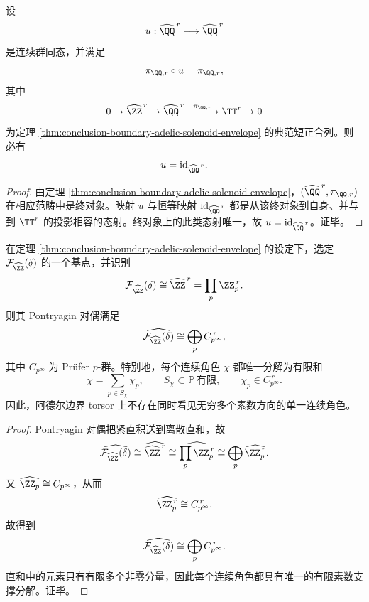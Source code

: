 \begin{corollary}[通用连通包络相对于基底的自同构刚性]\label{cor:conclusion-boundary-solenoid-over-base-rigidity}
设
\[
u:\widehat{\QQ}^{\,r}\longrightarrow \widehat{\QQ}^{\,r}
\]
是连续群同态，并满足
\[
\pi_{\QQ,r}\circ u=\pi_{\QQ,r},
\]
其中
\[
0\to \widehat{\ZZ}^{\,r}\to \widehat{\QQ}^{\,r}\xrightarrow{\ \pi_{\QQ,r}\ }\TT^r\to 0
\]
为定理 \ref{thm:conclusion-boundary-adelic-solenoid-envelope} 的典范短正合列。则必有
\[
u=\mathrm{id}_{\widehat{\QQ}^{\,r}}.
\]
\end{corollary}
\begin{proof}
由定理 \ref{thm:conclusion-boundary-adelic-solenoid-envelope}，\((\widehat{\QQ}^{\,r},\pi_{\QQ,r})\) 在相应范畴中是终对象。映射 \(u\) 与恒等映射
\(
\mathrm{id}_{\widehat{\QQ}^{\,r}}
\)
都是从该终对象到自身、并与到 \(\TT^r\) 的投影相容的态射。终对象上的此类态射唯一，故 \(u=\mathrm{id}_{\widehat{\QQ}^{\,r}}\)。证毕。
\end{proof}

\begin{theorem}\label{thm:conclusion-boundary-adelic-torsor-finite-prime-character-decomposition}
在定理 \ref{thm:conclusion-boundary-adelic-solenoid-envelope} 的设定下，选定 \(\mathcal F_{\widehat{\ZZ}}(\delta)\) 的一个基点，并识别
\[
\mathcal F_{\widehat{\ZZ}}(\delta)\cong \widehat{\ZZ}^{\,r}=\prod_p \ZZ_p^{\,r}.
\]
则其 Pontryagin 对偶满足
\[
\widehat{\mathcal F_{\widehat{\ZZ}}(\delta)}
\cong
\bigoplus_p C_{p^\infty}^{\,r},
\]
其中 \(C_{p^\infty}\) 为 Prüfer \(p\)-群。特别地，每个连续角色 \(\chi\) 都唯一分解为有限和
\[
\chi=\sum_{p\in S_\chi}\chi_p,
\qquad
S_\chi\subset \mathbb P\ \text{有限},
\qquad
\chi_p\in C_{p^\infty}^{\,r}.
\]
因此，阿德尔边界 torsor 上不存在同时看见无穷多个素数方向的单一连续角色。
\end{theorem}
\begin{proof}
Pontryagin 对偶把紧直积送到离散直和，故
\[
\widehat{\mathcal F_{\widehat{\ZZ}}(\delta)}
\cong
\widehat{\widehat{\ZZ}^{\,r}}
\cong
\widehat{\prod_p \ZZ_p^{\,r}}
\cong
\bigoplus_p \widehat{\ZZ_p^{\,r}}.
\]
又 \(\widehat{\ZZ_p}\cong C_{p^\infty}\)，从而
\[
\widehat{\ZZ_p^{\,r}}\cong C_{p^\infty}^{\,r}.
\]
故得到
\[
\widehat{\mathcal F_{\widehat{\ZZ}}(\delta)}
\cong
\bigoplus_p C_{p^\infty}^{\,r}.
\]
直和中的元素只有有限多个非零分量，因此每个连续角色都具有唯一的有限素数支撑分解。证毕。
\end{proof}

